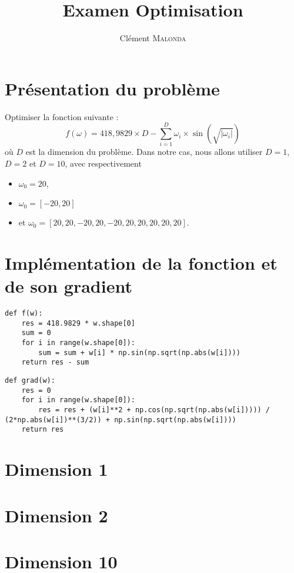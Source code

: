 \documentclass[12pt]{article}
\begin{document}
\title{Examen Optimisation}
\author{Clément \textsc{Malonda}}
\maketitle

\lstset{language=python}

\section*{Présentation du problème}

Optimiser la fonction suivante :
$$f(\omega) = 418,9829\times D - \sum_{i=1}^{D}\omega_i \times \sin(\sqrt{|\omega_i|})$$
où $D$ est la dimension du problème. Dans notre cas, nous allons utiliser $D = 1$, $D = 2$ et $D = 10$, avec respectivement
\begin{itemize}
    \item[\textbullet] $\omega_0 = 20$,
    \item[\textbullet] $\omega_0 = [-20, 20]$
    \item[\textbullet]et $\omega_0 = [20, 20, -20, 20, -20, 20, 20, 20, 20, 20]$.
\end{itemize}

\section{Implémentation de la fonction et de son gradient}
\begin{lstlisting}
def f(w):
    res = 418.9829 * w.shape[0]
    sum = 0
    for i in range(w.shape[0]):
        sum = sum + w[i] * np.sin(np.sqrt(np.abs(w[i])))
    return res - sum
\end{lstlisting}

\begin{lstlisting}
def grad(w):
    res = 0
    for i in range(w.shape[0]):
        res = res + (w[i]**2 + np.cos(np.sqrt(np.abs(w[i])))) / (2*np.abs(w[i])**(3/2)) + np.sin(np.sqrt(np.abs(w[i])))
    return res
\end{lstlisting}

\section{Dimension 1}

\section{Dimension 2}

\section{Dimension 10}
\end{document}
